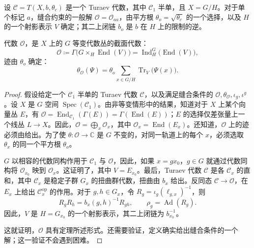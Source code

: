 \begin{theorem}\label{thm:2.16}
设 $\mathcal{C}=T(X,b,\theta_c)$ 是一个 Turaev 代数，其中 $\mathcal{C}_1$ 半单，且 $X=G/H$。对于单个标记 $a$，缝合约束的一般解 $\mathcal{O}=\mathcal{O}_{aa}$，由平方根 $\theta_o=\sqrt{\theta_c}$ 的一个选择，以及 $H$ 的一个射影表示 $V$ 确定；其二上闭链 $b_o$ 是 $b$ 在 $H$ 上的限制的逆。

代数 $\mathcal{O}$，是 $X$ 上的 $G$ 等变代数丛的截面代数：
\begin{equation}\label{eq:2.107}
\mathcal{O}\coloneqq\Gamma\bigl(G\times_H\operatorname{End}(V)\bigr)
=\operatorname{Ind}_H^G\bigl(\operatorname{End}(V)\bigr),
\end{equation}
迹由 $\theta_o$ 确定：
\begin{equation}\label{eq:2.108}
\theta_{\mathcal{O}}(\Psi)=\theta_o\sum_{x\in G/H}\operatorname{Tr}_{V}\bigl(\Psi(x)\bigr).
\end{equation}
\end{theorem}

\begin{proof}
假设给定一个 $\mathcal{C}_1$ 半单的 Turaev 代数 $\mathcal{C}$，以及满足缝合条件的 $\mathcal{O},\theta_{\mathcal{O}},\iota_g,\iota^g$。设 $X$ 是 $G$ 空间 $\operatorname{Spec}(\mathcal{C}_1)$。由非等变情形中的结果，知道对于 $X$ 上某个向量丛 $E$，有 $\mathcal{O}=\operatorname{End}_{\mathcal{C}_1}(\Gamma(E))=\Gamma(\operatorname{End}(E))$；$E$ 的选择仅差张量上一个线丛 $L\to X$。因此，$\mathcal{O}=\bigoplus_x\mathcal{O}_x$，其中 $\mathcal{O}_x=\operatorname{End}(E_x)$。还知道，$\mathcal{O}$ 上的迹必须由给出。为了使 $\theta\colon\mathcal{O}\to\mathbb{C}$ 是 $G$ 不变的，对同一轨道上的每个 $x$，必须选取 $\theta_x$ 的同一个平方根 $\theta_o$。

$G$ 以相容的代数同构作用于 $\mathcal{C}_1$ 与 $\mathcal{O}$，因此，如果 $x=gx_0$，$g\in G$ 就通过代数同构将 $\mathcal{O}_{x_0}$ 映到 $\mathcal{O}_x$。这证明了，其中 $V=E_{x_0}$。最后，Turaev 代数 $\mathcal{C}$ 是各 $\mathcal{C}_x$ 的直和，其中 $\mathcal{C}_x$ 是稳定子群 $G_x$ 的扭曲群代数，扭曲由 $b_x$ 给出。反同态 $\mathcal{C}\to\mathcal{O}$，在 $E_x$ 上给出 $\mathcal{C}_x^{\mathrm{op}}$ 的作用。对于 $g,h\in G_x$，令 $R_g=\iota_g(\ell_{g,x})^{-1}$，则
\[
R_gR_h=b_x(g,h)^{-1}R_{gh},\qquad\rho_g=\operatorname{Ad}(R_g).
\]
因此，$V$ 是 $H=G_{x_0}$ 的一个射影表示，其二上闭链为 $b_{x_0}^{-1}$。

这就证明，$\mathcal{O}$ 具有定理所述形式。还需要验证，定义确实给出缝合条件的一个解；这一验证不会遇到困难。\BookQED
\end{proof}

